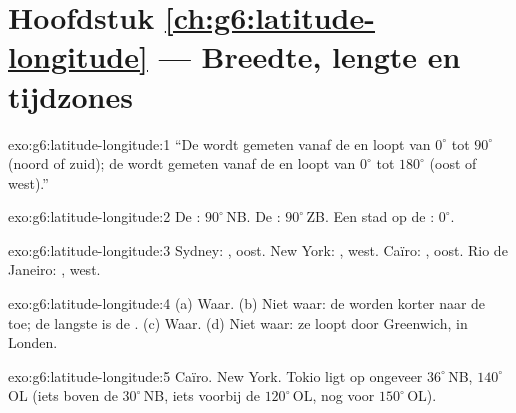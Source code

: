 \section*{Hoofdstuk \ref{ch:g6:latitude-longitude} --- Breedte, lengte en tijdzones}

\begin{solution}{exo:g6:latitude-longitude:1}
``De  wordt gemeten vanaf de  en loopt van $0^\circ$ tot
$90^\circ$ (noord of zuid); de  wordt gemeten vanaf de
 en loopt van $0^\circ$ tot $180^\circ$ (oost of west).''
\end{solution}

\begin{solution}{exo:g6:latitude-longitude:2}
De : $90^\circ$\,NB. De : $90^\circ$\,ZB. Een stad op de
: $0^\circ$.
\end{solution}

\begin{solution}{exo:g6:latitude-longitude:3}
Sydney: , oost. New York: , west.
Caïro: , oost. Rio de Janeiro: ,
west.
\end{solution}

\begin{solution}{exo:g6:latitude-longitude:4}
(a) Waar. (b) Niet waar: de  worden korter naar de 
toe; de langste is de . (c) Waar. (d) Niet waar: ze loopt door
Greenwich, in Londen.
\end{solution}

\begin{solution}{exo:g6:latitude-longitude:5}
Caïro. New York. Tokio ligt op ongeveer $36^\circ$\,NB, $140^\circ$\,OL
(iets boven de  $30^\circ$\,NB, iets voorbij de 
$120^\circ$\,OL, nog voor $150^\circ$\,OL).
\end{solution}

